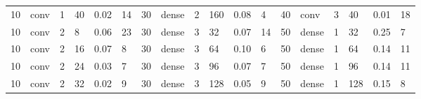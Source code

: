\begin{table}[t!]
{\begin{tabular}{@{}llllll|llllll|llllll@{}}
10                              & conv                           & 1                              & 40                             & 0.02                             & 14                                & 30                              & dense                          & 2                              & 160                            & 0.08                           & 4                                 & 40                              & conv                           & 3                              & 40                             & 0.01                           & 18                               \\
10                              & conv                           & 2                              & 8                              & 0.06                             & 23                                & 30                              & dense                          & 3                              & 32                             & 0.07                           & 14                                & 50                              & dense                          & 1                              & 32                             & 0.25                           & 7                                \\
10                              & conv                           & 2                              & 16                             & 0.07                             & 8                                 & 30                              & dense                          & 3                              & 64                             & 0.10                           & 6                                 & 50                              & dense                          & 1                              & 64                             & 0.14                           & 11                               \\
10                              & conv                           & 2                              & 24                             & 0.03                             & 7                                 & 30                              & dense                          & 3                              & 96                             & 0.07                           & 7                                 & 50                              & dense                          & 1                              & 96                             & 0.14                           & 11                               \\
10                              & conv                           & 2                              & 32                             & 0.02                             & 9                                 & 30                              & dense                          & 3                              & 128                            & 0.05                           & 9                                 & 50                              & dense                          & 1                              & 128                            & 0.15                           & 8                                \\

\end{tabular}}
\end{table}
